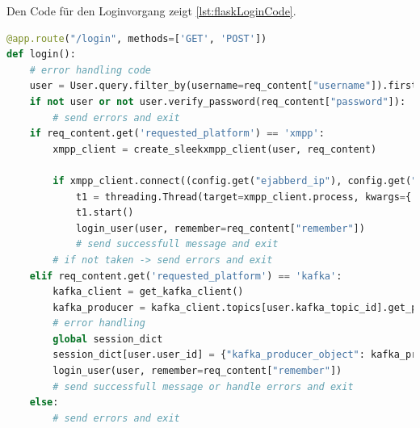 \documentclass[a4paper,titlepage,halfparskip,12pt]{scrreprt}
\begin{document}
\begin{onehalfspacing}
Den Code für den Loginvorgang zeigt \autoref{lst:flaskLoginCode}.

\begin{lstlisting}[language=python, caption={Code der \acs{API}-Route für den Benutzerlogin}, label={lst:flaskLoginCode}]
@app.route("/login", methods=['GET', 'POST'])
def login():
    # error handling code
    user = User.query.filter_by(username=req_content["username"]).first()
    if not user or not user.verify_password(req_content["password"]):
        # send errors and exit
    if req_content.get('requested_platform') == 'xmpp':
        xmpp_client = create_sleekxmpp_client(user, req_content)

        if xmpp_client.connect((config.get("ejabberd_ip"), config.get("ejabberd_port"))):
            t1 = threading.Thread(target=xmpp_client.process, kwargs={'block': True}, daemon=True)
            t1.start()
            login_user(user, remember=req_content["remember"])
            # send successfull message and exit
        # if not taken -> send errors and exit
    elif req_content.get('requested_platform') == 'kafka':
        kafka_client = get_kafka_client()
        kafka_producer = kafka_client.topics[user.kafka_topic_id].get_producer()
        # error handling
        global session_dict
        session_dict[user.user_id] = {"kafka_producer_object": kafka_producer, "topic": user.kafka_topic_id, "requested_platform": "kafka"}
        login_user(user, remember=req_content["remember"])
        # send successfull message or handle errors and exit
    else:
        # send errors and exit
\end{lstlisting}


\end{onehalfspacing}
\end{document}

